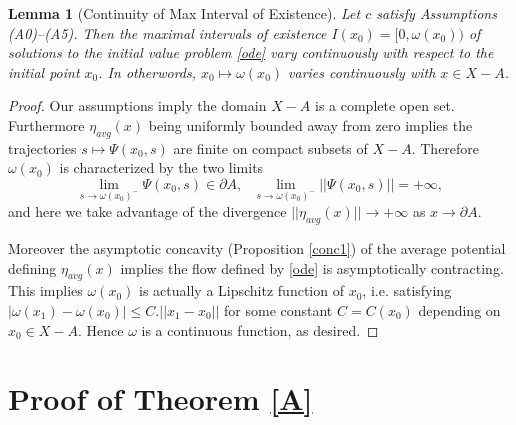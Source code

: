 \documentclass[12pt]{amsart}
\newtheorem{lem}{Lemma}
\theoremstyle{definition}
\theoremstyle{remark}
\newcommand{\del}{\partial}
\begin{document}
\begin{lem}[Continuity of Max Interval of Existence]\label{maxinterval}
Let $c$ satisfy Assumptions (A0)--(A5). Then the maximal intervals of existence $I(x_0)=[0, \omega(x_0))$ of solutions to the initial value problem \ref{ode} vary continuously with respect to the initial point $x_0$. In otherwords, $x_0\mapsto \omega(x_0)$ varies continuously with $x\in X-A$.
\end{lem}
\begin{proof}
Our assumptions imply the domain $X-A$ is a complete open set. Furthermore $\eta_{avg}(x)$ being uniformly bounded away from zero implies the trajectories $s\mapsto \Psi(x_0, s)$ are finite on compact subsets of $X-A$. Therefore $\omega(x_0)$ is characterized by the two limits $$\lim_{s\to \omega(x_0)^-} \Psi(x_0, s) \in \del A ,~~~ \lim_{s\to \omega(x_0)^-} ||\Psi(x_0, s)||=+\infty,$$ and here we take advantage of the divergence $||\eta_{avg}(x)||\to +\infty$ as $x\to \del A$. 

Moreover the asymptotic concavity (Proposition \ref{conc1}) of the average potential defining $\eta_{avg}(x)$ implies the flow defined by \ref{ode} is asymptotically contracting. This implies $\omega(x_0)$ is actually a Lipschitz function of $x_0$, i.e. satisfying $|\omega(x_1)-\omega(x_0)|\leq C.||x_1-x_0||$ for some constant $C=C(x_0)$ depending on $x_0\in X-A$. Hence $\omega$ is a continuous function, as desired.  
\end{proof}












\section{Proof of Theorem \ref{A}}
\end{document}
